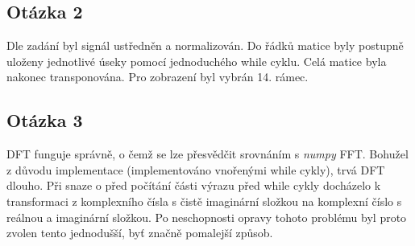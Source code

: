 \documentclass[a4paper,12pt]{article}
\begin{document}
\subsection{Otázka 2}
\begin{figure}[h]
\centering
{}
\end{figure}
Dle zadání byl signál ustředněn a normalizován. Do řádků matice byly postupně uloženy jednotlivé úseky pomocí jednoduchého while cyklu. Celá matice byla nakonec transponována. Pro zobrazení byl vybrán 14. rámec.

\subsection{Otázka 3}
\begin{figure}[h]
\centering
{}
\end{figure}
DFT funguje správně, o čemž se lze přesvědčit srovnáním s \emph{numpy} FFT. Bohužel z důvodu implementace (implementováno vnořenými while cykly), trvá DFT dlouho. Při snaze o před počítání části výrazu před while cykly docházelo k transformaci z komplexního čísla s čistě imaginární složkou na komplexní číslo s reálnou a imaginární složkou. Po neschopnosti opravy tohoto problému byl proto zvolen tento jednodušší, byť značně pomalejší způsob.
\end{document}
